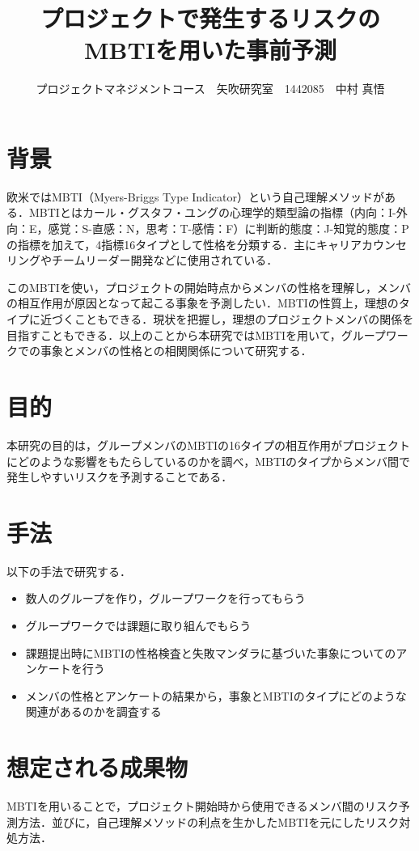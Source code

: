 \documentclass[uplatex,twocolumn,dvipdfmx]{jsarticle}
\title{\vspace{-5mm}\fontsize{14pt}{0pt}\selectfont プロジェクトで発生するリスクのMBTIを用いた事前予測}
\author{\normalsize プロジェクトマネジメントコース　矢吹研究室　1442085　中村 真悟}
\date{}
\begin{document}
\fontsize{10.5pt}{\baselineskip}\selectfont
\maketitle






\section{背景}
欧米ではMBTI（Myers-Briggs Type Indicator）という自己理解メソッドがある．MBTIとはカール・グスタフ・ユングの心理学的類型論の指標（内向：I-外向：E，感覚：S-直感：N，思考：T-感情：F）に判断的態度：J-知覚的態度：Pの指標を加えて，4指標16タイプとして性格を分類する．主にキャリアカウンセリングやチームリーダー開発などに使用されている．

このMBTIを使い，プロジェクトの開始時点からメンバの性格を理解し，メンバの相互作用が原因となって起こる事象を予測したい．MBTIの性質上，理想のタイプに近づくこともできる．現状を把握し，理想のプロジェクトメンバの関係を目指すこともできる．以上のことから本研究ではMBTIを用いて，グループワークでの事象とメンバの性格との相関関係について研究する．

\section{目的}
本研究の目的は，グループメンバのMBTIの16タイプの相互作用がプロジェクトにどのような影響をもたらしているのかを調べ，MBTIのタイプからメンバ間で発生しやすいリスクを予測することである．

\section{手法}
以下の手法で研究する．
\begin{itemize}
\item 数人のグループを作り，グループワークを行ってもらう
\item グループワークでは課題に取り組んでもらう
\item 課題提出時にMBTIの性格検査\cite{mbti}と失敗マンダラ\cite{110009915588}に基づいた事象についてのアンケートを行う
\item メンバの性格とアンケートの結果から，事象とMBTIのタイプにどのような関連があるのかを調査する
\end{itemize}
\section{想定される成果物}
MBTIを用いることで，プロジェクト開始時から使用できるメンバ間のリスク予測方法．並びに，自己理解メソッドの利点を生かしたMBTIを元にしたリスク対処方法．
\end{document}
